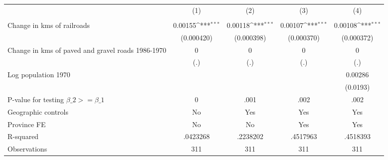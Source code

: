 {
\def\sym#1{\ifmmode^{#1}\else\(^{#1}\)\fi}
\begin{tabular}{l*{4}{c}}
\hline\hline
                &\multicolumn{1}{c}{(1)}&\multicolumn{1}{c}{(2)}&\multicolumn{1}{c}{(3)}&\multicolumn{1}{c}{(4)}\\
                &\multicolumn{1}{c}{}&\multicolumn{1}{c}{}&\multicolumn{1}{c}{}&\multicolumn{1}{c}{}\\
\hline
Change in kms of railroads&  0.00155\sym{***}&  0.00118\sym{***}&  0.00107\sym{***}&  0.00108\sym{***}\\
                &(0.000420)         &(0.000398)         &(0.000370)         &(0.000372)         \\
[1em]
Change in kms of paved and gravel roads 1986-1970&        0         &        0         &        0         &        0         \\
                &      (.)         &      (.)         &      (.)         &      (.)         \\
[1em]
Log population 1970&                  &                  &                  &  0.00286         \\
                &                  &                  &                  & (0.0193)         \\
\hline
P-value for testing $\beta\_{2} >= \beta\_{1}$&        0         &     .001         &     .002         &     .002         \\
Geographic controls&       No         &      Yes         &      Yes         &      Yes         \\
Province FE     &       No         &       No         &      Yes         &      Yes         \\
R-squared       & .0423268         & .2238202         & .4517963         & .4518393         \\
Observations    &      311         &      311         &      311         &      311         \\
\hline\hline
\end{tabular}
}
